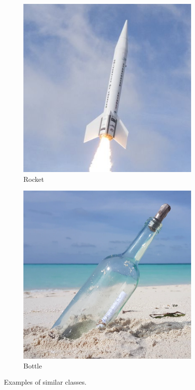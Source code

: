 \documentclass[pageno]{jpaper}
\begin{document}
\begin{figure}[t]
\begin{subfigure}{.23\textwidth}
  \centering
  \includegraphics[width=\textwidth]{rocket.png}
  \caption{Rocket}
  \label{fig:sub2}
\end{subfigure}
\begin{subfigure}{.23\textwidth}
  \centering
  \includegraphics[width=\textwidth]{bottle.png}
  \caption{Bottle}
  \label{fig:sub3}
\end{subfigure}
\label{fig:exampleSimilar}
\caption{Examples of similar classes.}
\end{figure}
\end{document}
